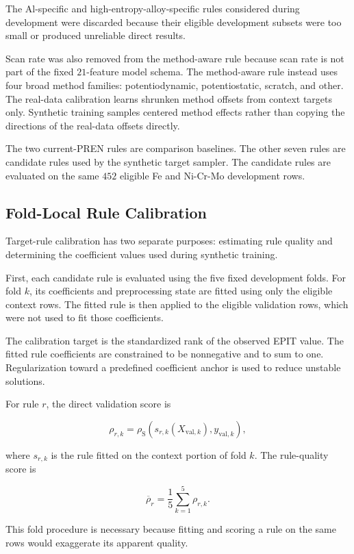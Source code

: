 \documentclass{article}
\begin{document}
The Al-specific and high-entropy-alloy-specific rules considered during
development were discarded because their eligible development subsets were
too small or produced unreliable direct results.

Scan rate was also removed from the method-aware rule because scan rate is not
part of the fixed \(21\)-feature model schema. The method-aware rule instead
uses four broad method families: potentiodynamic, potentiostatic, scratch, and
other. The real-data calibration learns shrunken method offsets from context
targets only. Synthetic training samples centered method effects rather than
copying the directions of the real-data offsets directly.

The two current-PREN rules are comparison baselines. The other seven rules are
candidate rules used by the synthetic target sampler. The candidate rules are
evaluated on the same \(452\) eligible Fe and Ni-Cr-Mo development rows.

\subsection{Fold-Local Rule Calibration}
\label{sec:epit-rule-calibration}

Target-rule calibration has two separate purposes: estimating rule quality and
determining the coefficient values used during synthetic training.

First, each candidate rule is evaluated using the five fixed development
folds. For fold \(k\), its coefficients and preprocessing state are fitted
using only the eligible context rows. The fitted rule is then applied to the
eligible validation rows, which were not used to fit those coefficients.

The calibration target is the standardized rank of the observed EPIT value.
The fitted rule coefficients are constrained to be nonnegative and to sum to
one. Regularization toward a predefined coefficient anchor is used to reduce
unstable solutions.

For rule \(r\), the direct validation score is

\[
\rho_{r,k}
=
\rho_{\mathrm{S}}
\left(
s_{r,k}(X_{\mathrm{val},k}),
y_{\mathrm{val},k}
\right),
\]

where \(s_{r,k}\) is the rule fitted on the context portion of fold \(k\).
The rule-quality score is

\[
\overline{\rho}_r
=
\frac{1}{5}
\sum_{k=1}^{5}
\rho_{r,k}.
\]

This fold procedure is necessary because fitting and scoring a rule on the
same rows would exaggerate its apparent quality.
\end{document}
